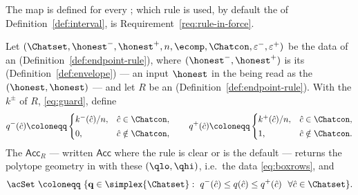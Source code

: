 
The map is defined for every ; which rule is
used, by default the  of
Definition~\ref{def:interval}, is Requirement~\ref{req:rule-in-force}.

\begin{definition}\label{def:construction}
Let
$(\Chatset,{\honest}^{-},{\honest}^{+},n,\ecomp,\Chatcon,\varepsilon^{-},\varepsilon^{+})$
be the data of an  (Definition~\ref{def:endpoint-rule}),
where $({\honest}^{-},{\honest}^{+})$ is its 
(Definition~\ref{def:envelope}) --- an input $\honest$ in the
 being read as the 
$(\honest,\honest)$ --- and let $R$ be an 
(Definition~\ref{def:endpoint-rule}). With the 
$k^{\pm}$ of $R$, \eqref{eq:guard}, define
\begin{equation}\label{eq:boxbounds}
  q^{-}(\hat c)\coloneqq
  \begin{cases}k^{-}(\hat c)/n,&\hat c\in\Chatcon,\\[2pt] 0,&\hat c\notin\Chatcon,\end{cases}
  \qquad
  q^{+}(\hat c)\coloneqq
  \begin{cases}k^{+}(\hat c)/n,&\hat c\in\Chatcon,\\[2pt] 1,&\hat c\notin\Chatcon.\end{cases}
\end{equation}
The  $\mathsf{Acc}_R$ --- written $\mathsf{Acc}$
where the rule is clear or is the default --- returns the
$\mathrm{polytope}$ geometry in  with these
$(\qlo,\qhi)$, i.e.\ the data \eqref{eq:boxrows}, and
\begin{equation}\label{eq:accset}
  \acSet\ \coloneqq\ \{\mathbf{q}\in\simplex{\Chatset}:\
  q^{-}(\hat c)\le q(\hat c)\le q^{+}(\hat c)\ \ \forall\hat c\in\Chatset\}.
\end{equation}
\end{definition}

